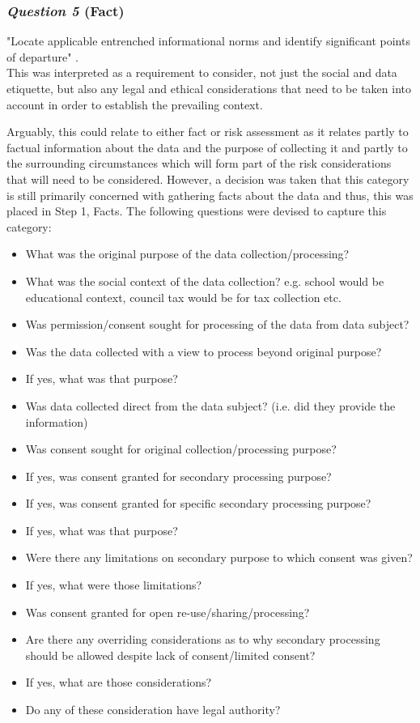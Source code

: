 \subsubsection {{\it Question 5} {\bf(Fact)}}
"Locate applicable entrenched informational norms and identify significant points of departure" \citep{Nissenbaum_2010}.\\

This was interpreted as a requirement to consider, not just the social and data etiquette, but also any legal and ethical considerations that need to be taken into account in order to establish the prevailing context. 

Arguably, this could relate to either fact or risk assessment as it relates partly to factual information about the data and the purpose of collecting it and partly to the surrounding circumstances which will form part of the risk considerations that will need to be considered. However, a decision was taken that this category is still primarily concerned with gathering facts about the data and thus, this was placed in Step 1, Facts. The following questions were devised to capture this category:
\begin{itemize}
\item What was the original purpose of the data collection/processing?
\item What was the social context of the data collection? e.g. school would be educational context, council tax would be for tax collection etc.
\item Was permission/consent sought for processing of the data from data subject?
\item Was the data collected with a view to process beyond original purpose?
\item If yes, what was that purpose?
\item Was data collected direct from the data subject? (i.e. did they provide the information)
\item Was consent sought for original collection/processing purpose?
\item If yes, was consent granted for secondary processing purpose? 
\item If yes, was consent granted for specific secondary processing purpose? 
\item If yes, what was that purpose?
\item Were there any limitations on secondary purpose to which consent was given? 
\item If yes, what were those limitations?
\item Was consent granted for open re-use/sharing/processing?
\item Are there any overriding considerations as to why secondary processing should be allowed despite lack of consent/limited consent?
\item If yes, what are those considerations? 
\item Do any of these consideration have legal authority? 
\end{itemize}
